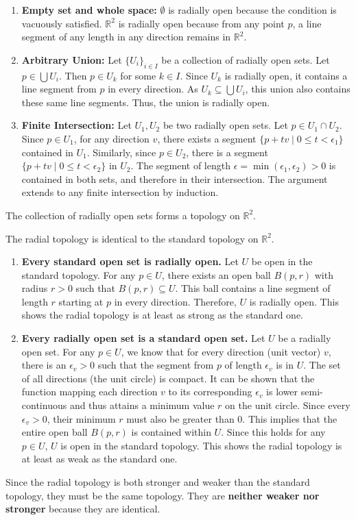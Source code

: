 \begin{solution}
  \begin{enumerate}
      \item \textbf{Empty set and whole space:} $\emptyset$ is radially open because the condition is vacuously satisfied. $\mathbb{R}^2$ is radially open because from any point $p$, a line segment of any length in any direction remains in $\mathbb{R}^2$.
      \item \textbf{Arbitrary Union:} Let $\{U_i\}_{i \in I}$ be a collection of radially open sets. Let $p \in \bigcup U_i$. Then $p \in U_k$ for some $k \in I$. Since $U_k$ is radially open, it contains a line segment from $p$ in every direction. As $U_k \subseteq \bigcup U_i$, this union also contains these same line segments. Thus, the union is radially open.
      \item \textbf{Finite Intersection:} Let $U_1, U_2$ be two radially open sets. Let $p \in U_1 \cap U_2$. Since $p \in U_1$, for any direction $v$, there exists a segment $\{p+tv \mid 0 \le t < \epsilon_1\}$ contained in $U_1$. Similarly, since $p \in U_2$, there is a segment $\{p+tv \mid 0 \le t < \epsilon_2\}$ in $U_2$. The segment of length $\epsilon = \min(\epsilon_1, \epsilon_2) > 0$ is contained in both sets, and therefore in their intersection. The argument extends to any finite intersection by induction.
  \end{enumerate}
  The collection of radially open sets forms a topology on $\mathbb{R}^2$.

  The radial topology is identical to the standard topology on $\mathbb{R}^2$.
  \begin{enumerate}
      \item \textbf{Every standard open set is radially open.} Let $U$ be open in the standard topology. For any $p \in U$, there exists an open ball $B(p, r)$ with radius $r>0$ such that $B(p, r) \subseteq U$. This ball contains a line segment of length $r$ starting at $p$ in every direction. Therefore, $U$ is radially open. This shows the radial topology is at least as strong as the standard one.

      \item \textbf{Every radially open set is a standard open set.} Let $U$ be a radially open set. For any $p \in U$, we know that for every direction (unit vector) $v$, there is an $\epsilon_v > 0$ such that the segment from $p$ of length $\epsilon_v$ is in $U$. The set of all directions (the unit circle) is compact. It can be shown that the function mapping each direction $v$ to its corresponding $\epsilon_v$ is lower semi-continuous and thus attains a minimum value $r$ on the unit circle. Since every $\epsilon_v > 0$, their minimum $r$ must also be greater than 0. This implies that the entire open ball $B(p, r)$ is contained within $U$. Since this holds for any $p \in U$, $U$ is open in the standard topology. This shows the radial topology is at least as weak as the standard one.
  \end{enumerate}
  Since the radial topology is both stronger and weaker than the standard topology, they must be the same topology. They are \textbf{neither weaker nor stronger} because they are identical.
\end{solution}

